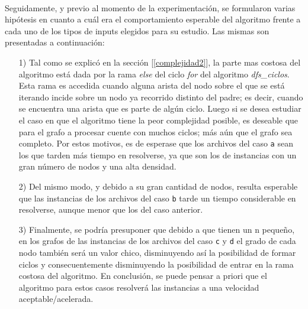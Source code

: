 \paragraph{}
Seguidamente, y previo al momento de la experimentación, se formularon varias hipótesis en cuanto a cuál era el comportamiento esperable del algoritmo frente a cada uno de los tipos de inputs elegidos para su estudio. Las mismas son presentadas a continuación:
	\begin{itemize}
		\item[1)]{Tal como se explicó en la sección [\ref{complejidad2}], la parte mas costosa del algoritmo está dada por la rama \textit{else} del ciclo \textit{for} del algoritmo \textit{dfs\_ciclos}. Esta rama es accedida cuando alguna arista del nodo sobre el que se está iterando incide sobre un nodo ya recorrido distinto del padre; es decir, cuando se encuentra una arista que es parte de algún ciclo. Luego si se desea estudiar el caso en que el algoritmo tiene la peor complejidad posible, es deseable que para el grafo a procesar cuente con muchos ciclos; más aún que el grafo sea completo. Por estos motivos, es de esperase que los archivos del caso \texttt{a} sean los que tarden más tiempo en resolverse, ya que son los de instancias con un gran número de nodos y una alta densidad.}
		\item[2)]{Del mismo modo, y debido a su gran cantidad de nodos, resulta esperable que las instancias de los archivos del caso \texttt{b} tarde un tiempo considerable en resolverse, aunque menor que los del caso anterior.} 
		\item[3)]{Finalmente, se podría presuponer que debido a que tienen un n pequeño, en los grafos de las instancias de los archivos del caso \texttt{c} y \texttt{d} el grado de cada nodo también será un valor chico, disminuyendo así la posibilidad de formar ciclos y consecuentemente disminuyendo la posibilidad de entrar en la rama costosa del algoritmo. En conclusión, se puede pensar a priori que el algoritmo para estos casos resolverá las instancias a una velocidad aceptable/acelerada.}
	\end{itemize}


